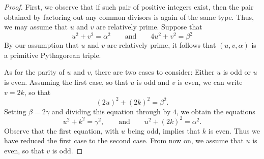 \begin{proof}
  First, we observe that if such pair of positive integers exist, then the pair obtained by factoring out any common divisors is again of the same type. Thus, we may assume that $u$ and $v$ are relatively prime. Suppose that
  \begin{equation*}
    u^2+v^2=\alpha^2\qquad\text{and}\qquad 4u^2+v^2=\beta^2
  \end{equation*}
  By our assumption that $u$ and $v$ are relatively prime, it follows that $(u,v,\alpha)$ is a primitive Pythagorean triple. 
  
  As for the parity of $u$ and $v$, there are two cases to consider: Either $u$ is odd or $u$ is even. Assuming the first case, so that $u$ is odd and $v$ is even, we can write $v=2k$, so that
  \begin{equation*}
    (2u)^2+(2k)^2=\beta^2.
  \end{equation*}
  Setting $\beta=2\gamma$ and dividing this equation through by $4$, we obtain the equations
  \begin{equation*}
    u^2+k^2=\gamma^2,\qquad\text{and}\qquad u^2+(2k)^2=\alpha^2.
  \end{equation*}
  Observe that the first equation, with $u$ being odd, implies that $k$ is even. Thus we have reduced the first case to the second case. From now on, we assume that $u$ is even, so that $v$ is odd.


\end{proof}
